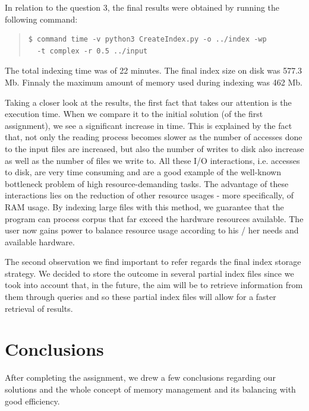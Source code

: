 \documentclass[12pt]{article}
\begin{document}
In relation to the question 3, the final results were obtained by running the 
following command:

\begingroup
\addtolength\leftmargini{-0.4in}
\addtolength\baselineskip{-0.05in}
\begin{quote}
\begin{verbatim}
$ command time -v python3 CreateIndex.py -o ../index -wp 
  -t complex -r 0.5 ../input
\end{verbatim}
\end{quote}
\endgroup

The total indexing time was of 22 minutes. The final index size on disk was 577.3 Mb.
Finnaly the maximum amount of memory used during indexing was 462 Mb.

Taking a closer look at the results, the first fact that takes our attention is the
execution time.
When we compare it to the initial solution (of the first assignment), we see a
significant increase in time.
This is explained by the fact that, not only the reading process becomes slower
as the number of accesses done to the input files are increased, but also the 
number of writes to disk also increase as well as the number of files we write to.
All these I/O interactions, i.e. accesses to disk, are very time consuming and 
are a good example of the well-known bottleneck problem of high resource-demanding tasks.
The advantage of these interactions lies on the reduction of other resource usages - 
more specifically, of RAM usage. 
By indexing large files with this method, we guarantee that the program can process
corpus that far exceed the hardware resources available.
The user now gains power to balance resource usage according to his / her needs and
available hardware.

The second observation we find important to refer regards the final index storage 
strategy. We decided to store the outcome in several partial index files since we
took into account that, in the future, the aim will be to retrieve information from
them through queries and so these partial index files will allow for a faster retrieval
of results.

\newpage
\section*{Conclusions}

After completing the assignment, we drew a few conclusions regarding our
solutions and the whole concept of memory management and its balancing with
good efficiency.
\end{document}
